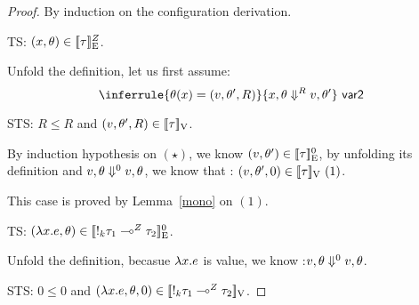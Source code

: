 \begin{proof}
  By induction on the configuration derivation.\\
   

  TS: $(x, \env) \in  \lre{}{\nnatA}{ \type}$.
  
  Unfold the definition, let us first assume: \[   \inferrule{  \env(x)  =  (\valr, \env',  \adapt)  }{x,
      \env  \bigstep{\adapt} \valr, \env' }~\textsf{var2}  \]
  
  STS: $R \leq R $  and $ (\valr, \env', R  ) \in \lrv{\type} $.

  By induction hypothesis on $(\star)$, we know $ (\valr, \env') \in \lre{}{0}{\type} $, by unfolding its definition and $ \valr, \env \bigstep{0} \valr, \env $,  we know that : $ (\valr, \env' ,0) \in \lrv{\type}~(1)$.

  This case is proved by Lemma~\ref{mono} on $(1)$.\\


   TS: $(\lambda x. \expr , \env) \in  \lre{}{0}{  \bang{\idx} \type_1\lto{\nnatA} \type_2 }$.
  
  Unfold the definition, becasue $\lambda x. \expr$ is value, we know :$ \valr, \env \bigstep{0} \valr, \env$.
  
  STS: $0 \leq 0 $  and $ (\lambda x.\expr, \env, 0  ) \in \lrv{ \bang{\idx} \type_1\lto{\nnatA} \type_2 } $.


\end{proof}
